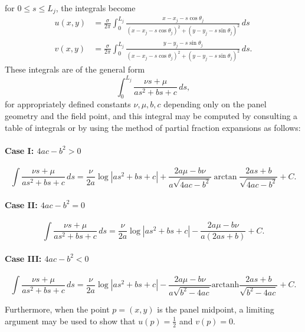 \documentclass[10pt]{article}
\begin{document}
for $0\leq s\leq L_j$, the integrals become
\begin{align*}
u(x,y) &= \frac{\sigma}{2\pi}\int_0^{L_j}\frac{x-x_j-s\cos\theta_j}{(x-x_j-s\cos\theta_j)^2+(y-y_j-s\sin\theta_j)^2}\,ds\\
v(x,y) &=\frac{\sigma}{2\pi}\int_0^{L_j}\frac{y-y_j-s\sin\theta_j}{(x-x_j-s\cos\theta_j)^2+(y-y_j-s\sin\theta_j)^2}\,ds.
\end{align*}
These integrals are of the general form \[\int_0^{L_j}\frac{\nu s+\mu}{as^2+bs+c}\,ds,\] for appropriately defined constants $\nu,\mu,b,c$ depending only on the panel geometry and the field point, and this integral may be computed by consulting a table of integrals or by using the method of partial fraction expansions as follows:
\paragraph{Case I: $4ac-b^2>0$}
\[\int\frac{\nu s+\mu}{as^2+bs+c}\,ds = \frac{\nu}{2a}\log\left|as^2+bs+c\right|+\frac{2a\mu-b\nu}{a\sqrt{4ac-b^2}}\arctan\frac{2as+b}{\sqrt{4ac-b^2}}+C.\]
\paragraph{Case II: $4ac-b^2=0$}
\[\int\frac{\nu s+\mu}{as^2+bs+c}\,ds = \frac{\nu}{2a}\log\left|as^2+bs+c\right|-\frac{2a\mu-b\nu}{a(2as+b)}+C.\]
\paragraph{Case III: $4ac-b^2<0$}
\[\int\frac{\nu s+\mu}{as^2+bs+c}\,ds = \frac{\nu}{2a}\log\left|as^2+bs+c\right|-\frac{2a\mu-b\nu}{a\sqrt{b^2-4ac}}\text{arctanh}\frac{2as+b}{\sqrt{b^2-4ac}}+C.\]


Furthermore, when the point $p=(x,y)$ is the panel midpoint, a limiting argument may be used to show that $u(p) = \frac{1}{2}$ and $v(p) = 0$.



\end{document}
